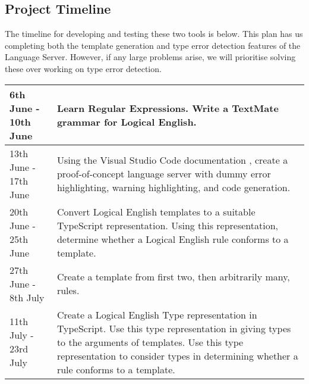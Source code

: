 \documentclass[../main.tex]{subfiles}
\begin{document}
\subsection*{Project Timeline}
The timeline for developing and testing these two tools is below. This plan has us completing both the template generation and type error detection features of the Language Server. However, if any large problems arise, we will prioritise solving these over working on type error detection.
\\
\begin{tabularx}{\textwidth}{|l|X|}
    \hline
    6th June - 10th June & 
    Learn Regular Expressions. \newline
    Write a TextMate grammar for Logical English.
    \\
    \hline
    13th June - 17th June & 
    Using the Visual Studio Code documentation \cite[]{vsc_langserver_features}, create a proof-of-concept language server with dummy error highlighting, warning highlighting, and code generation.
    \\ \hline
    20th June - 25th June & 
    Convert Logical English templates to a suitable TypeScript representation. \newline
    Using this representation, determine whether a Logical English rule conforms to a template.
    \\ \hline
    27th June - 8th July & 
    Create a template from first two, then arbitrarily many, rules.
    \\ \hline
    11th July - 23rd July & 
    Create a Logical English Type representation in TypeScript. \newline
    Use this type representation in giving types to the arguments of templates. Use this type representation to consider types in determining whether a rule conforms to a template.
    \\ \hline
\end{tabularx}
\end{document}

